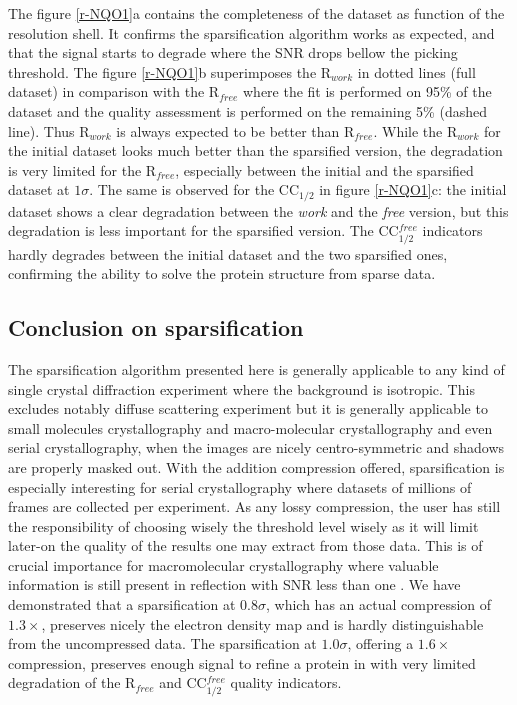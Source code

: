 \documentclass[preprint]{iucr}              %
\begin{document}
The figure \ref{r-NQO1}a contains the completeness of the dataset as function of the resolution shell. 
It confirms the sparsification algorithm works as expected, and that the signal starts to degrade where the SNR drops bellow the picking threshold. 
The figure \ref{r-NQO1}b superimposes the R$_{work}$ in dotted lines (full dataset) in comparison with the R$_{free}$ where the fit is performed on 95\% of the dataset and the quality assessment is performed on the remaining 5\% (dashed line).
Thus R$_{work}$ is always expected to be better than R$_{free}$.
While the R$_{work}$ for the initial dataset looks much better than the sparsified version, the degradation is very limited for the R$_{free}$, especially between the initial and the sparsified dataset at $1\sigma$.
The same is observed for the CC$_{1/2}$ in figure \ref{r-NQO1}c: the initial dataset shows a clear degradation between the \textit{work} and the \textit{free} version, but this degradation is less important for the sparsified version.
The CC$_{1/2}^{free}$ indicators hardly degrades between the initial dataset and the two sparsified ones, confirming the ability to solve the protein structure from sparse data.

\subsection{Conclusion on sparsification}
The sparsification algorithm presented here is generally applicable to any kind of single crystal diffraction experiment where the background is isotropic. 
This excludes notably diffuse scattering experiment but it is generally applicable to small molecules crystallography and macro-molecular crystallography and even serial crystallography, when the images are nicely centro-symmetric and shadows are properly masked out.
With the addition compression offered, sparsification is especially interesting for serial crystallography where datasets of millions of frames are collected per experiment.
As any lossy compression, the user has still the responsibility of choosing wisely the threshold level wisely as it will limit later-on the quality of the results one may extract from those data. 
This is of crucial importance for macromolecular crystallography where valuable information is still present in reflection with SNR less than one \cite{cc1/2}.
We have demonstrated that a sparsification at $0.8\sigma$, which has an actual compression of $1.3 \times$, preserves nicely the electron density map and is hardly distinguishable from the uncompressed data.
The sparsification at $1.0\sigma$, offering a $1.6\times$ compression, preserves enough signal to refine a protein in with very limited degradation of the R$_{free}$ and CC$_{1/2}^{free}$ quality indicators.
\end{document}
